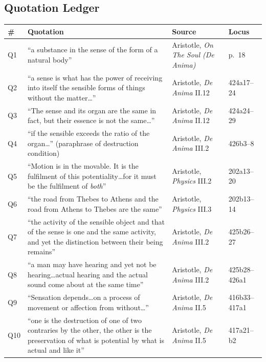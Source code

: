 \documentclass[12pt]{article}
\begin{document}
\subsection*{Quotation Ledger}

\begin{center}
\footnotesize
\begin{tabular}{|l|l|l|l|}
\hline
\textbf{\#} & \textbf{Quotation} & \textbf{Source} & \textbf{Locus} \\
\hline
Q1 & ``a substance in the sense of the form of a natural body'' & Aristotle, \textit{On The Soul (De Anima)} & p.~18 \\
\hline
Q2 & ``a sense is what has the power of receiving into itself the sensible forms of things without the matter\dots'' & Aristotle, \textit{De Anima} II.12 & 424a17--24 \\
\hline
Q3 & ``The sense and its organ are the same in fact, but their essence is not the same\dots'' & Aristotle, \textit{De Anima} II.12 & 424a24--29 \\
\hline
Q4 & ``if the sensible exceeds the ratio of the organ\dots'' (paraphrase of destruction condition) & Aristotle, \textit{De Anima} III.2 & 426b3--8 \\
\hline
Q5 & ``Motion is in the movable. It is the fulfilment of this potentiality\dots for it must be the fulfilment of \textit{both}'' & Aristotle, \textit{Physics} III.2 & 202a13--20 \\
\hline
Q6 & ``the road from Thebes to Athens and the road from Athens to Thebes are the same'' & Aristotle, \textit{Physics} III.3 & 202b13--14 \\
\hline
Q7 & ``the activity of the sensible object and that of the sense is one and the same activity, and yet the distinction between their being remains'' & Aristotle, \textit{De Anima} III.2 & 425b26--27 \\
\hline
Q8 & ``a man may have hearing and yet not be hearing\dots actual hearing and the actual sound come about at the same time'' & Aristotle, \textit{De Anima} III.2 & 425b28--426a1 \\
\hline
Q9 & ``Sensation depends\dots on a process of movement or affection from without\dots'' & Aristotle, \textit{De Anima} II.5 & 416b33--417a1 \\
\hline
Q10 & ``one is the destruction of one of two contraries by the other, the other is the preservation of what is potential by what is actual and like it'' & Aristotle, \textit{De Anima} II.5 & 417a21--b2 \\
\hline

\end{tabular}
\end{center}
\end{document}
